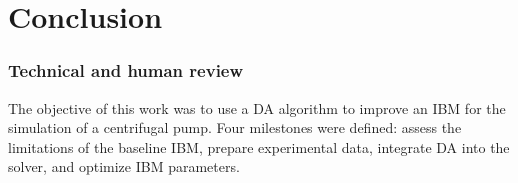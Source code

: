\chapter*{Conclusion}
\vspace{-0.5cm}




\subsection*{Technical and human review}

The objective of this work was to use a DA algorithm to improve an IBM for the simulation of a centrifugal pump. Four milestones were defined: assess the limitations of the baseline IBM, prepare experimental data, integrate DA into the solver, and optimize IBM parameters.

